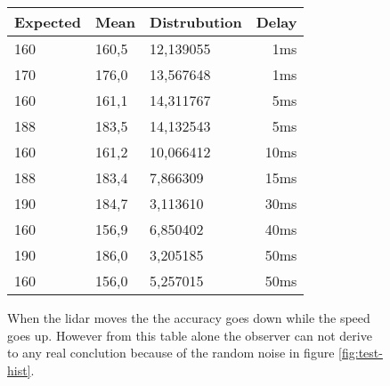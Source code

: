 \begin{figure}
    \begin{center}
        \small
        \begin{tabular}{ l | l | l | r| }
            Expected&Mean&Distrubution&Delay\\
            \hline
            160&  160,5& 12,139055 & 1ms\\
            170&  176,0& 13,567648 & 1ms\\
            160&  161,1& 14,311767 & 5ms\\
            188&  183,5& 14,132543 & 5ms\\
            160&  161,2& 10,066412 & 10ms\\
            188&  183,4& 7,866309  & 15ms\\
            190&  184,7& 3,113610  & 30ms\\
            160&  156,9& 6,850402  & 40ms\\
            190&  186,0& 3,205185  & 50ms\\
            160&  156,0& 5,257015  & 50ms
        \end{tabular}
    \end{center}
    \caption{When the lidar moves the the accuracy goes down while the speed goes up. However from this table alone the observer can not derive to any real conclution because of the random noise in figure \ref{fig:test-hist}.}
    \label{table:rotating}
\end{figure}
